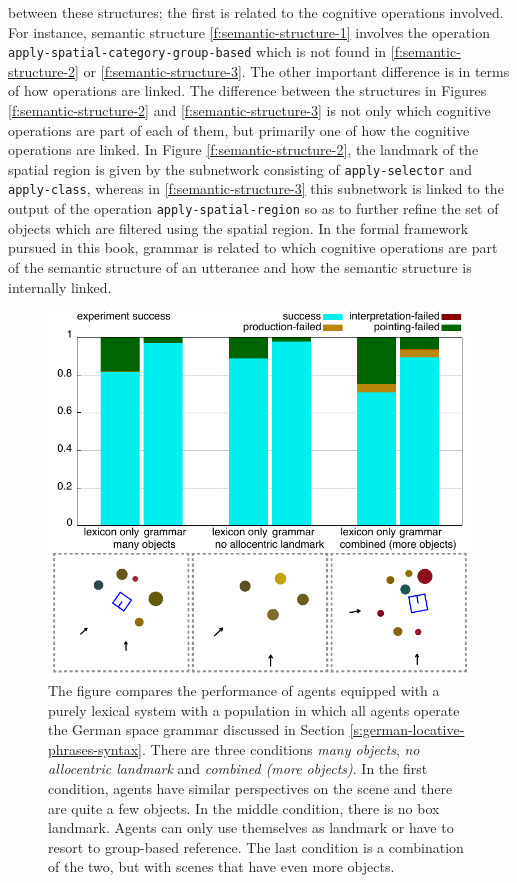 between these structures; the first is related to the cognitive
operations involved. For instance, semantic structure \ref{f:semantic-structure-1}
involves the operation {\footnotesize\tt apply-spatial-category-group-based} 
which is not found in
\ref{f:semantic-structure-2} or \ref{f:semantic-structure-3}. The other 
important difference is in terms of how operations are linked. The 
difference between the structures in Figures \ref{f:semantic-structure-2}
and \ref{f:semantic-structure-3} is not only which cognitive operations 
are part of each of them, but primarily one of how the cognitive 
operations are linked. In Figure \ref{f:semantic-structure-2},
the landmark of the spatial region is given by the subnetwork consisting 
of {\footnotesize\tt apply-selector} and {\footnotesize\tt apply-class}, whereas in 
\ref{f:semantic-structure-3} this subnetwork is linked to the output of
the operation {\footnotesize\tt apply-spatial-region} so as to further refine the 
set of objects which are filtered using the spatial region. In the formal 
framework pursued in this book, grammar is related to which cognitive 
operations are part of the semantic structure of an 
utterance and how the semantic structure is internally linked.

\begin{figure}
\includegraphics[width=1.0\columnwidth]{figs/why-grammar-german}
\caption[German locative phrases with and without grammar]{%
The figure compares
the performance of agents equipped with a purely 
lexical system with a population in 
which all agents operate the German space 
grammar discussed in Section 
\ref{s:german-locative-phrases-syntax}.
There are three conditions \emph{many objects}, 
\emph{no allocentric landmark} and 
\emph{combined (more objects)}. In the first 
condition, agents have similar perspectives on the scene 
and there are quite a few objects. In the middle condition, there 
is no box landmark. Agents can only use 
themselves as landmark or have to resort to group-based 
reference. The last condition is a combination
of the two, but with scenes that have even more objects.}
\label{f:why-grammar-german}
\end{figure}


